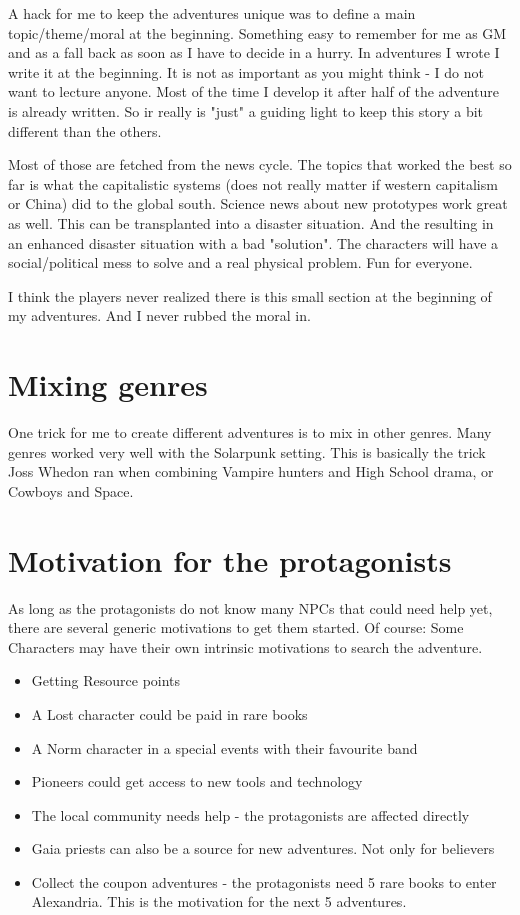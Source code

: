 A hack for me to keep the adventures unique was to define a main topic/theme/moral at the beginning. Something easy to remember for me as GM and as a fall back as soon as I have to decide in a hurry.
In adventures I wrote I write it at the beginning. It is not as important as you might think - I do not want to lecture anyone. Most of the time I develop it after half of the adventure is already written. So ir really is "just" a guiding light to keep this story a bit different than the others.

Most of those are fetched from the news cycle. The topics that worked the best so far is what the capitalistic systems (does not really matter if western capitalism or China) did to the global south. Science news about new prototypes work great as well. This can be transplanted into a disaster situation. And the resulting in an enhanced disaster situation with a bad "solution". The characters will have a social/political mess to solve and a real physical problem. Fun for everyone.

I think the players never realized there is this small section at the beginning of my adventures. And I never rubbed the moral in.

\section{Mixing genres}

One trick for me to create different adventures is to mix in other genres. Many genres worked very well with the Solarpunk setting. This is basically the trick Joss Whedon ran when combining Vampire hunters and High School drama, or Cowboys and Space.

\section{Motivation for the protagonists}

As long as the protagonists do not know many NPCs that could need help yet, there are several generic motivations to get them started. Of course: Some Characters may have their own intrinsic motivations to search the adventure.

\begin{itemize}
\item{Getting Resource points}
\item{A Lost character could be paid in rare books}
\item{A Norm character in a special events with their favourite band}
\item {Pioneers could get access to new tools and technology}
\item {The local community needs help - the protagonists are affected directly}
\item {Gaia priests can also be a source for new adventures. Not only for believers}
\item{Collect the coupon adventures - the protagonists need 5 rare books to enter Alexandria. This is the motivation for the next 5 adventures.}
\end{itemize}


